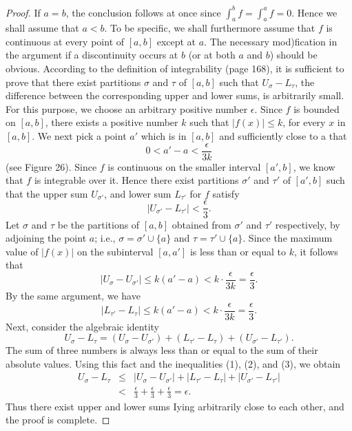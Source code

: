 \begin{proof}
If $a = b$, the conclusion follows at once since $\int_a^b f = \int_a^a f = 0$. Hence we shall assume that $a < b$. To be specific, we shall furthermore assume that $f$ is continuous at every point of $[a, b]$ except at $a$. The necessary mod)fication in the argument if a discontinuity occurs at $b$ (or at both $a$ and $b$) should be obvious. According to the definition of integrability (page 168), it is sufficient to prove that there exist partitions $\sigma$ and $\tau$ of $[a, b]$ such that $U_\sigma - L_\tau$, the difference between the corresponding upper and lower sums, is arbitrarily small. For this purpose, we choose an arbitrary positive number $\epsilon$. Since $f$ is bounded on $[a, b]$, there exists a positive number $k$ such that $|f(x)| \leq k$, for every $x$ in $[a, b]$. We next pick a point $a'$ which is in $[a, b]$ and sufficiently close to a that
$$
0 < a' - a < \frac{\epsilon}{3k}
$$
(see Figure 26). Since $f$ is continuous on the smaller interval $[a', b]$, we know that $f$ is integrable over it. Hence there exist partitions $\sigma'$ and $\tau'$ of $[a', b]$ such that the upper sum $U_{\sigma'}$, and lower sum $L_{\tau'}$ for $f$ satisfy
\begin{equation}
| U_{\sigma'} - L_{\tau'} | < \frac{\epsilon}{3}.  
\label{eq8.6.1}
\end{equation}
Let $\sigma$ and $\tau$ be the partitions of $[a, b]$ obtained from $\sigma'$ and $\tau'$ respectively, by adjoining the point $a$; i.e., $\sigma = \sigma' \cup \{ a \}$ and $\tau = \tau' \cup \{ a \}$. Since the maximum value of $|f(x)|$ on the subinterval $[a, a']$ is less than or equal to $k$, it follows that
\begin{equation}
| U_\sigma - U_{\sigma'} | \leq k (a' - a) < k \cdot \frac{\epsilon}{3k} = \frac{\epsilon}{3} . 
\label{eq8.6.2}
\end{equation}
By the same argument, we have
\begin{equation}
| L_{\tau'} - L_{\tau} | \leq k (a' - a) < k \cdot \frac{\epsilon}{3k} = \frac{\epsilon}{3} . 
\label{eq8.6.3}
\end{equation}
\noindent Next, consider the algebraic identity
$$
U_\sigma  - L_\tau = (U_\sigma - U_{\sigma'}) + (L_{\tau'} - L_\tau) + (U_{\sigma'} - L_{\tau'}). 
$$
The sum of three numbers is always less than or equal to the sum of their absolute values. Using this fact and the inequalities (1), (2), and (3), we obtain 
\begin{eqnarray*}
U_\sigma - L_\tau 
&\leq& | U_\sigma - U_{\sigma'} | + | L_{\tau'} - L_\tau | + | U_{\sigma'} - L_{\tau'} | \\
&<   &  \frac{\epsilon}{3} + \frac{\epsilon}{3}  + \frac{\epsilon}{3}  = \epsilon .
\end{eqnarray*}
Thus there exist upper and lower sums Iying arbitrarily close to each other, and the proof is complete.
\end{proof}

